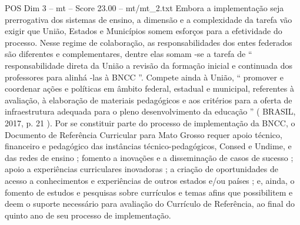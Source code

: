 \begin{textsample}{POS Dim 3 – mt – Score 23.00 – mt/mt\_2.txt}
Embora a implementação seja prerrogativa dos sistemas de ensino, a dimensão e a complexidade da tarefa vão exigir que União, Estados e Municípios somem esforços para a efetividade do processo.
Nesse regime de colaboração, as responsabilidades dos entes federados são diferentes e complementares, dentre elas somam -se a tarefa de “ responsabilidade direta da União a revisão da formação inicial e continuada dos professores para alinhá -las à BNCC ”.
Compete ainda à União, “ promover e coordenar ações e políticas em âmbito federal, estadual e municipal, referentes à avaliação, à elaboração de materiais pedagógicos e aos critérios para a oferta de infraestrutura adequada para o pleno desenvolvimento da educação ” ( BRASIL, 2017, p. 21 ).
Por se constituir parte do processo de implementação da BNCC, o Documento de Referência Curricular para Mato Grosso requer apoio técnico, financeiro e pedagógico das instâncias técnico-pedagógicos, Consed e Undime, e das redes de ensino ; fomento a inovações e a disseminação de casos de sucesso ; apoio a experiências curriculares inovadoras ; a criação de oportunidades de acesso a conhecimentos e experiências de outros estados e/ou países ; e, ainda, o fomento de estudos e pesquisas sobre currículos e temas afins que possibilitem e deem o suporte necessário para avaliação do Currículo de Referência, ao final do quinto ano de seu processo de implementação.

\end{textsample}
